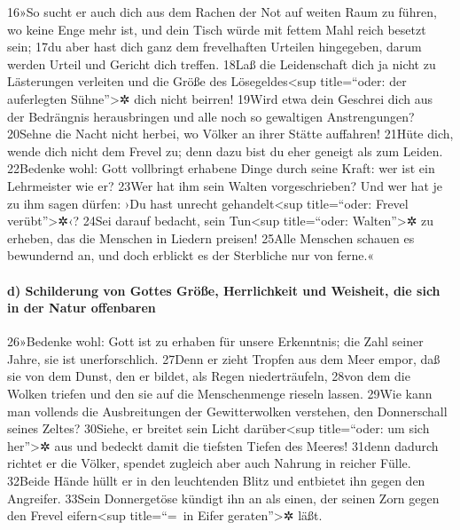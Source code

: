 16»So sucht er auch dich aus dem Rachen der Not auf weiten Raum zu
führen, wo keine Enge mehr ist, und dein Tisch würde mit fettem Mahl
reich besetzt sein; 17du aber hast dich ganz dem frevelhaften Urteilen
hingegeben, darum werden Urteil und Gericht dich treffen. 18Laß die
Leidenschaft dich ja nicht zu Lästerungen verleiten und die Größe des
Lösegeldes\textless sup title=``oder: der auferlegten
Sühne''\textgreater✲ dich nicht beirren! 19Wird etwa dein Geschrei dich
aus der Bedrängnis herausbringen und alle noch so gewaltigen
Anstrengungen? 20Sehne die Nacht nicht herbei, wo Völker an ihrer Stätte
auffahren! 21Hüte dich, wende dich nicht dem Frevel zu; denn dazu bist
du eher geneigt als zum Leiden. 22Bedenke wohl: Gott vollbringt erhabene
Dinge durch seine Kraft: wer ist ein Lehrmeister wie er? 23Wer hat ihm
sein Walten vorgeschrieben? Und wer hat je zu ihm sagen dürfen: ›Du hast
unrecht gehandelt\textless sup title=``oder: Frevel
verübt''\textgreater✲‹? 24Sei darauf bedacht, sein Tun\textless sup
title=``oder: Walten''\textgreater✲ zu erheben, das die Menschen in
Liedern preisen! 25Alle Menschen schauen es bewundernd an, und doch
erblickt es der Sterbliche nur von ferne.«

\hypertarget{d-schilderung-von-gottes-gruxf6uxdfe-herrlichkeit-und-weisheit-die-sich-in-der-natur-offenbaren}{%
\paragraph{d) Schilderung von Gottes Größe, Herrlichkeit und Weisheit,
die sich in der Natur
offenbaren}\label{d-schilderung-von-gottes-gruxf6uxdfe-herrlichkeit-und-weisheit-die-sich-in-der-natur-offenbaren}}

26»Bedenke wohl: Gott ist zu erhaben für unsere Erkenntnis; die Zahl
seiner Jahre, sie ist unerforschlich. 27Denn er zieht Tropfen aus dem
Meer empor, daß sie von dem Dunst, den er bildet, als Regen
niederträufeln, 28von dem die Wolken triefen und den sie auf die
Menschenmenge rieseln lassen. 29Wie kann man vollends die Ausbreitungen
der Gewitterwolken verstehen, den Donnerschall seines Zeltes? 30Siehe,
er breitet sein Licht darüber\textless sup title=``oder: um sich
her''\textgreater✲ aus und bedeckt damit die tiefsten Tiefen des Meeres!
31denn dadurch richtet er die Völker, spendet zugleich aber auch Nahrung
in reicher Fülle. 32Beide Hände hüllt er in den leuchtenden Blitz und
entbietet ihn gegen den Angreifer. 33Sein Donnergetöse kündigt ihn an
als einen, der seinen Zorn gegen den Frevel eifern\textless sup
title=``=~in Eifer geraten''\textgreater✲ läßt.

